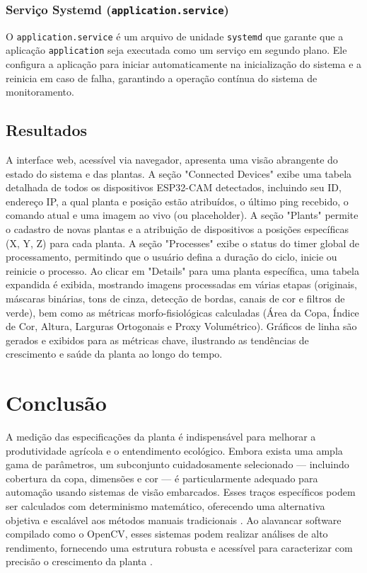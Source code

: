 \documentclass[12pt, a4paper]{article}
\begin{document}
	\subsubsection{Serviço Systemd (\texttt{application.service})}
	O \texttt{application.service} é um arquivo de unidade \texttt{systemd} que garante que a aplicação \texttt{application} seja executada como um serviço em segundo plano. Ele configura a aplicação para iniciar automaticamente na inicialização do sistema e a reinicia em caso de falha, garantindo a operação contínua do sistema de monitoramento.
	
	\subsection{Resultados}
	A interface web, acessível via navegador, apresenta uma visão abrangente do estado do sistema e das plantas. A seção "Connected Devices" exibe uma tabela detalhada de todos os dispositivos ESP32-CAM detectados, incluindo seu ID, endereço IP, a qual planta e posição estão atribuídos, o último ping recebido, o comando atual e uma imagem ao vivo (ou placeholder). A seção "Plants" permite o cadastro de novas plantas e a atribuição de dispositivos a posições específicas (X, Y, Z) para cada planta. A seção "Processes" exibe o status do timer global de processamento, permitindo que o usuário defina a duração do ciclo, inicie ou reinicie o processo. Ao clicar em "Details" para uma planta específica, uma tabela expandida é exibida, mostrando imagens processadas em várias etapas (originais, máscaras binárias, tons de cinza, detecção de bordas, canais de cor e filtros de verde), bem como as métricas morfo-fisiológicas calculadas (Área da Copa, Índice de Cor, Altura, Larguras Ortogonais e Proxy Volumétrico). Gráficos de linha são gerados e exibidos para as métricas chave, ilustrando as tendências de crescimento e saúde da planta ao longo do tempo.
	
	\section{Conclusão}
	
	A medição das especificações da planta é indispensável para melhorar a produtividade agrícola e o entendimento ecológico. Embora exista uma ampla gama de parâmetros, um subconjunto cuidadosamente selecionado --- incluindo cobertura da copa, dimensões e cor --- é particularmente adequado para automação usando sistemas de visão embarcados. Esses traços específicos podem ser calculados com determinismo matemático, oferecendo uma alternativa objetiva e escalável aos métodos manuais tradicionais \cite{Rahaman2015, Li2014}. Ao alavancar software compilado como o OpenCV, esses sistemas podem realizar análises de alto rendimento, fornecendo uma estrutura robusta e acessível para caracterizar com precisão o crescimento da planta \cite{Bradski2000, Schindelin2012}.
	
\end{document}
